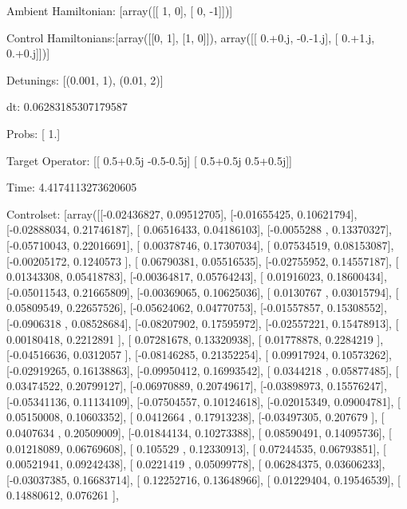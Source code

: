 \documentclass{article}
\begin{document}
    

\newpage

Ambient Hamiltonian: [array([[ 1,  0],
       [ 0, -1]])]

Control Hamiltonians:[array([[0, 1],
       [1, 0]]), array([[ 0.+0.j, -0.-1.j],
       [ 0.+1.j,  0.+0.j]])]

Detunings: [(0.001, 1), (0.01, 2)]

 dt: 0.06283185307179587

Probs: [ 1.]

Target Operator: [[ 0.5+0.5j -0.5-0.5j]
 [ 0.5+0.5j  0.5+0.5j]]

Time: 4.4174113273620605

Controlset: [array([[-0.02436827,  0.09512705],
       [-0.01655425,  0.10621794],
       [-0.02888034,  0.21746187],
       [ 0.06516433,  0.04186103],
       [-0.0055288 ,  0.13370327],
       [-0.05710043,  0.22016691],
       [ 0.00378746,  0.17307034],
       [ 0.07534519,  0.08153087],
       [-0.00205172,  0.1240573 ],
       [ 0.06790381,  0.05516535],
       [-0.02755952,  0.14557187],
       [ 0.01343308,  0.05418783],
       [-0.00364817,  0.05764243],
       [ 0.01916023,  0.18600434],
       [-0.05011543,  0.21665809],
       [-0.00369065,  0.10625036],
       [ 0.0130767 ,  0.03015794],
       [ 0.05809549,  0.22657526],
       [-0.05624062,  0.04770753],
       [-0.01557857,  0.15308552],
       [-0.0906318 ,  0.08528684],
       [-0.08207902,  0.17595972],
       [-0.02557221,  0.15478913],
       [ 0.00180418,  0.2212891 ],
       [ 0.07281678,  0.13320938],
       [ 0.01778878,  0.2284219 ],
       [-0.04516636,  0.0312057 ],
       [-0.08146285,  0.21352254],
       [ 0.09917924,  0.10573262],
       [-0.02919265,  0.16138863],
       [-0.09950412,  0.16993542],
       [ 0.0344218 ,  0.05877485],
       [ 0.03474522,  0.20799127],
       [-0.06970889,  0.20749617],
       [-0.03898973,  0.15576247],
       [-0.05341136,  0.11134109],
       [-0.07504557,  0.10124618],
       [-0.02015349,  0.09004781],
       [ 0.05150008,  0.10603352],
       [ 0.0412664 ,  0.17913238],
       [-0.03497305,  0.207679  ],
       [ 0.0407634 ,  0.20509009],
       [-0.01844134,  0.10273388],
       [ 0.08590491,  0.14095736],
       [ 0.01218089,  0.06769608],
       [ 0.105529  ,  0.12330913],
       [ 0.07244535,  0.06793851],
       [ 0.00521941,  0.09242438],
       [ 0.0221419 ,  0.05099778],
       [ 0.06284375,  0.03606233],
       [-0.03037385,  0.16683714],
       [ 0.12252716,  0.13648966],
       [ 0.01229404,  0.19546539],
       [ 0.14880612,  0.076261  ],
\end{document}
